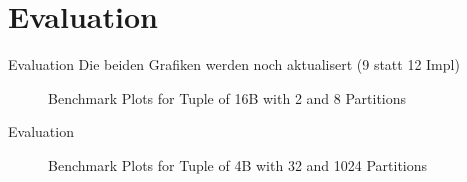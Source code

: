 \section{Evaluation}
\begin{frame}{Evaluation \small{\color{red} Die beiden Grafiken werden noch aktualisert (9 statt 12 Impl)}}

  \begin{figure}[h]
    \centering
    \begin{subfigure}{.49\textwidth}
      \centering
      \resizebox{\linewidth}{!}{}
    \end{subfigure}
    \begin{subfigure}{.49\textwidth}
      \centering
      \resizebox{\linewidth}{!}{}
    \end{subfigure}
    \begin{subfigure}{\textwidth}
      \centering
      \resizebox{.85\linewidth}{!}{}
    \end{subfigure}
    \caption[Shuffle Benchmark Plots for Tuple of 16B with 2 and 8 Partitions]{Benchmark Plots for Tuple of 16B with 2 and 8 Partitions}
    \label{plot-shuffle-16B-2-8}
  \end{figure}
\end{frame}

\begin{frame}{Evaluation}
  \begin{figure}[h]
    \centering
    \begin{subfigure}{.49\textwidth}
      \centering
      \resizebox{\linewidth}{!}{}
    \end{subfigure}
    \begin{subfigure}{.49\textwidth}
      \centering
      \resizebox{\linewidth}{!}{}
    \end{subfigure}
    \begin{subfigure}{\textwidth}
      \centering
      \resizebox{.85\linewidth}{!}{}
    \end{subfigure}
    \caption[Shuffle Benchmark Plots for Tuple of 4B with 32 and 1024 Partitions]{Benchmark Plots for Tuple of 4B with 32 and 1024 Partitions}
    \label{plot-shuffle-4B-32-1024}
  \end{figure}
\end{frame}

